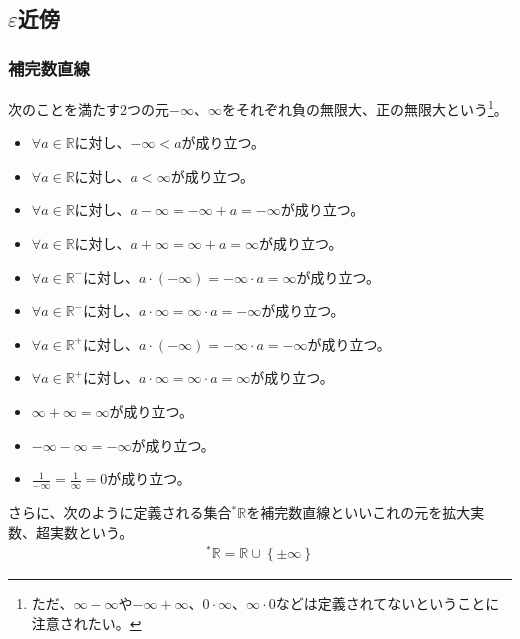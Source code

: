 \documentclass[dvipdfmx]{jsarticle}
\begin{document}
\subsection{$\varepsilon$近傍}%
\subsubsection{補完数直線}%
\begin{axs}[無限大の算法]
次のことを満たす2つの元$- \infty$、$\infty$をそれぞれ負の無限大、正の無限大という\footnote{ただ、$\infty - \infty$や$- \infty + \infty$、$0 \cdot \infty$、$\infty \cdot 0$などは定義されてないということに注意されたい。}。
\begin{itemize}
\item
  $\forall a \in \mathbb{R}$に対し、$- \infty < a$が成り立つ。
\item
  $\forall a \in \mathbb{R}$に対し、$a < \infty$が成り立つ。
\item
  $\forall a \in \mathbb{R}$に対し、$a - \infty = - \infty + a = - \infty$が成り立つ。
\item
  $\forall a \in \mathbb{R}$に対し、$a + \infty = \infty + a = \infty$が成り立つ。
\item
  $\forall a \in \mathbb{R}^{-}$に対し、$a \cdot ( - \infty) = - \infty \cdot a = \infty$が成り立つ。
\item
  $\forall a \in \mathbb{R}^{-}$に対し、$a \cdot \infty = \infty \cdot a = - \infty$が成り立つ。
\item
  $\forall a \in \mathbb{R}^{+}$に対し、$a \cdot ( - \infty) = - \infty \cdot a = - \infty$が成り立つ。
\item
  $\forall a \in \mathbb{R}^{+}$に対し、$a \cdot \infty = \infty \cdot a = \infty$が成り立つ。
\item
  $\infty + \infty = \infty$が成り立つ。
\item
  $- \infty - \infty = - \infty$が成り立つ。
\item
  $\frac{1}{- \infty} = \frac{1}{\infty} = 0$が成り立つ。
\end{itemize}
\end{axs}
\begin{dfn}
さらに、次のように定義される集合${}^{*}\mathbb{R}$を補完数直線といいこれの元を拡大実数、超実数という。
\begin{align*}
{}^{*}\mathbb{R} = \mathbb{R} \cup \left\{ \pm \infty \right\}
\end{align*}
\end{dfn}
\end{document}
